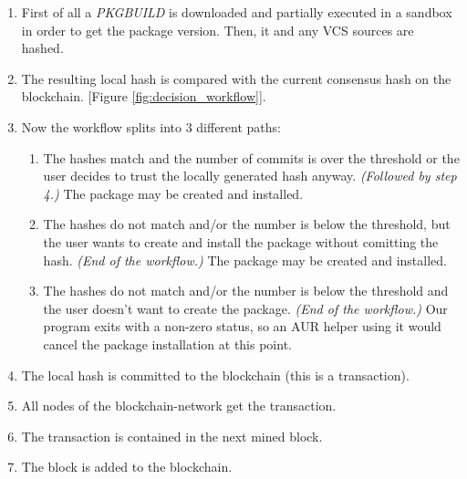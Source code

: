 \begin{enumerate}
	\item First of all a \textit{PKGBUILD} is downloaded and partially executed in a sandbox in order to get the package version. Then, it and any VCS sources are hashed.
	\item The resulting local hash is compared with the current consensus hash on the blockchain. [Figure \ref{fig:decision_workflow}].
	\item Now the workflow splits into 3 different paths:
	\begin{enumerate}
		\item The hashes match and the number of commits is over the threshold or the user decides to trust the locally generated hash anyway. \textit{(Followed by step 4.)} The package may be created and installed.
		\item The hashes do not match and/or the number is below the threshold, but the user wants to create and install the package without comitting the hash. \textit{(End of the workflow.)}
		The package may be created and installed.
		\item The hashes do not match and/or the number is below the threshold and the user doesn't want to create the package. \textit{(End of the workflow.)} Our program exits with a non-zero status, so an AUR helper using it would cancel the package installation at this point.
	\end{enumerate}
	\item The local hash is committed to the blockchain (this is a transaction).
	\item All nodes of the blockchain-network get the transaction.
	\item The transaction is contained in the next mined block.
	\item The block is added to the blockchain.
\end{enumerate}
